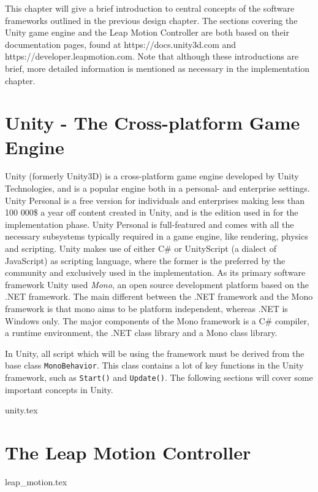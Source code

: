 This chapter will give a brief introduction to central concepts of the software frameworks outlined in the previous design chapter.
The sections covering the Unity game engine and the Leap Motion Controller are both based on their documentation pages, found at 
https://docs.unity3d.com and https://developer.leapmotion.com.
Note that although these introductions are brief, more detailed information is mentioned as necessary in the implementation chapter.

\section{Unity - The Cross-platform Game Engine}
Unity (formerly Unity3D) is a cross-platform game engine developed by Unity Technologies, and is a popular engine both in a personal- and enterprise settings.
Unity Personal is a free version for individuals and enterprises making less than 100 000\$ a year off content created in Unity, and is the 
edition used in for the implementation phase.
Unity Personal is full-featured and comes with all the necessary subsystems typically required in a game engine, like rendering, physics and scripting.
Unity makes use of either C\# or UnityScript (a dialect of JavaScript) as scripting language, where the former is the preferred by the community and 
exclusively used in the implementation. As its primary software framework Unity used \textit{Mono}, an open source development platform based on the .NET
framework. The main different between the .NET framework and the Mono framework is that mono aims to be platform independent, whereas .NET is Windows only.
The major components of the Mono framework is a C\# compiler, a runtime environment, the .NET class library and a Mono class library.

In Unity, all script which will be using the framework must be derived from the base class \texttt{MonoBehavior}. 
This class contains a lot of key functions in the Unity framework, such as \texttt{Start()} and \texttt{Update()}. 
The following sections will cover some important concepts in Unity.

{unity.tex}

\section{The Leap Motion Controller}
{leap_motion.tex}